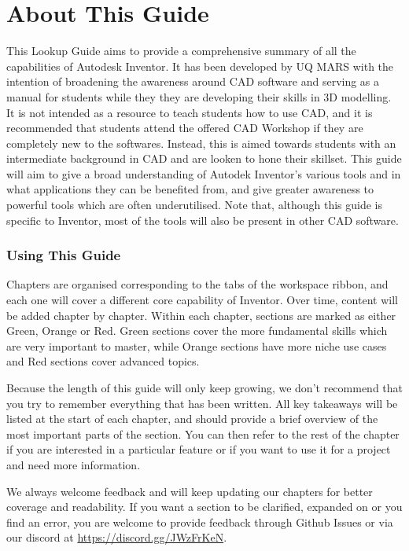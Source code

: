 \chapter{About This Guide}

This Lookup Guide aims to provide a comprehensive summary of all the capabilities of Autodesk Inventor. It has been developed by UQ MARS with the intention of broadening the awareness around CAD software and serving as a manual for students while they they are developing their skills in 3D modelling. It is not intended as a resource to teach students how to use CAD, and it is recommended that students attend the offered CAD Workshop if they are completely new to the softwares. Instead, this is aimed towards students with an intermediate background in CAD and are looken to hone their skillset. This guide will aim to give a broad understanding of Autodek Inventor's various tools and in what applications they can be benefited from, and give greater awareness to powerful tools which are often underutilised. Note that, although this guide is specific to Inventor, most of the tools will also be present in other CAD software.

\subsection{Using This Guide}
Chapters are organised corresponding to the tabs of the workspace ribbon, and each one will cover a different core capability of Inventor. Over time, content will be added chapter by chapter.
Within each chapter, sections are marked as either Green, Orange or Red. Green sections cover the more fundamental skills which are very important to master, while Orange sections have more niche use cases and Red sections cover advanced topics.

Because the length of this guide will only keep growing, we don't recommend that you try to remember everything that has been written. All key takeaways will be listed at the start of each chapter, and should provide a brief overview of the most important parts of the section. You can then refer to the rest of the chapter if you are interested in a particular feature or if you want to use it for a project and need more information.

We always welcome feedback and will keep updating our chapters for better coverage and readability. If you want a section to be clarified, expanded on or you find an error, you are welcome to provide feedback through Github Issues or via our discord at \url{https://discord.gg/JWzFrKeN}.
